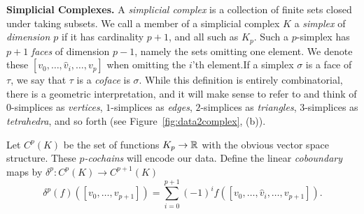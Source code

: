 \textbf{Simplicial Complexes.} A \emph{simplicial complex} is a collection of finite sets closed under taking subsets. We call a member of a simplicial complex $K$ a \emph{simplex} of \emph{dimension $p$} if it has cardinality $p+1$, and all such as $K_p$. Such a $p$-simplex has $p+1$ \emph{faces} of dimension $p-1$, namely the sets omitting one element. We denote these $[v_0,\dotsc,\hat{v}_i,\dotsc, v_p]$ when omitting the $i$'th element.If a simplex $\sigma$ is a face of $\tau$, we say that $\tau$ is a \emph{coface} is $\sigma$. While this definition is entirely combinatorial, there is a geometric interpretation, and it will make sense to refer to and think of $0$-simplices as \emph{vertices}, $1$-simplices as \emph{edges}, $2$-simplices as \emph{triangles}, $3$-simplices as \emph{tetrahedra}, and so forth (see Figure~\ref{fig:data2complex}, (b)).

Let $C^p(K)$ be the set of functions $K_p\to\mathbb{R}$ with the obvious vector space structure. These \emph{$p$-cochains} will encode our data. Define the linear \emph{coboundary} maps by $\delta^p:C^p(K)\to C^{p+1}(K)$
\begin{equation*}
\delta^p(f)([v_0,\dotsc,v_{p+1}]) = \sum_{i=0}^{p+1} (-1)^i f([v_0,\dotsc,\hat{v}_i,\dotsc,v_{p+1}]).
\end{equation*}

